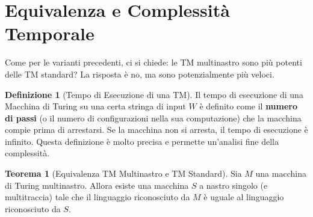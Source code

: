 \documentclass[a4paper]{article}
\theoremstyle{definition} %
\newtheorem{theorem}{Teorema}
\newtheorem{definition}{Definizione}
\begin{document}
\section{Equivalenza e Complessità Temporale}
Come per le varianti precedenti, ci si chiede: le TM multinastro sono più potenti delle TM standard? La risposta è no, ma sono potenzialmente più veloci.

\begin{definition}[Tempo di Esecuzione di una TM]
Il tempo di esecuzione di una Macchina di Turing su una certa stringa di input $W$ è definito come il \textbf{numero di passi} (o il numero di configurazioni nella sua computazione) che la macchina compie prima di arrestarsi. Se la macchina non si arresta, il tempo di esecuzione è infinito. Questa definizione è molto precisa e permette un'analisi fine della complessità.
\end{definition}

\begin{theorem}[Equivalenza TM Multinastro e TM Standard]
Sia $M$ una macchina di Turing multinastro. Allora esiste una macchina $S$ a nastro singolo (e multitraccia) tale che il linguaggio riconosciuto da $M$ è uguale al linguaggio riconosciuto da $S$.
\end{theorem}
\end{document}

